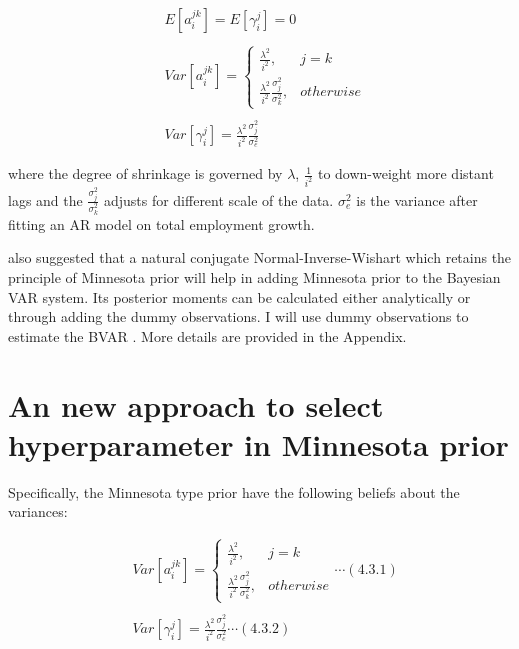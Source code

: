 \documentclass{monashthesis}
\begin{document}
\[
\begin{aligned}\label{eq:1}
&E[a_{i}^{jk}] = E[\gamma_{i}^j]=0\\
\\
&Var[a_i^{jk}]= 
\begin{cases}
\frac{\lambda^2}{i^2},&j=k\\
\frac{\lambda^2}{i^2}\frac{\sigma^2_{j}}{\sigma^2_k},& otherwise
\end{cases}\\
\\
&Var[\gamma_i^{j}]=\frac{\lambda^2}{i^2}\frac{\sigma^2_{j}}{\sigma^2_e}
\end{aligned}
\]

where the degree of shrinkage is governed by \(\lambda\), \(\frac{1}{i^2}\) to down-weight more distant lags and the \(\frac{\sigma_j^2}{\sigma_k^2}\) adjusts for different scale of the data. \(\sigma^2_e\) is the variance after fitting an AR model on total employment growth.

\textcite{banbura2010large} also suggested that a natural conjugate Normal-Inverse-Wishart which retains the principle of Minnesota prior will help in adding Minnesota prior to the Bayesian VAR system. Its posterior moments can be calculated either analytically or through adding the dummy observations. I will use dummy observations to estimate the BVAR \autocite{banbura2010large}. More details are provided in the Appendix.

\newpage

\hypertarget{an-new-approach-to-select-hyperparameter-in-minnesota-prior}{%
\section{An new approach to select hyperparameter in Minnesota prior}\label{an-new-approach-to-select-hyperparameter-in-minnesota-prior}}

Specifically, the Minnesota type prior have the following beliefs about the variances:

\[
\begin{aligned}
&Var[a_i^{jk}]= 
\begin{cases}
\frac{\lambda^2}{i^2},&j=k\\
\frac{\lambda^2}{i^2}\frac{\sigma^2_{j}}{\sigma^2_k},& otherwise
\end{cases}\cdots(4.3.1)\\
\\
&Var[\gamma_i^{j}]=\frac{\lambda^2}{i^2}\frac{\sigma^2_{j}}{\sigma^2_e}\cdots(4.3.2)
\end{aligned}
\]
\end{document}
